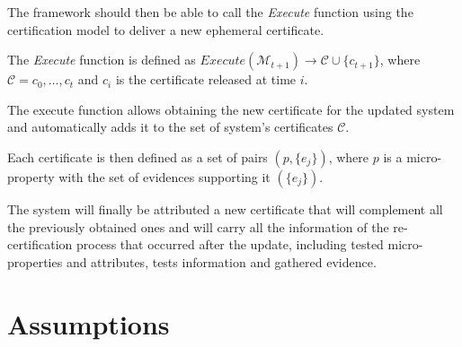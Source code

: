 The framework should then be able to call the \textit{Execute} function using the certification model to deliver a new ephemeral certificate.


\begin{defn}
The \textit{Execute} function is defined as \( Execute(\mathcal{M}_{t+1}) \rightarrow \mathcal{C} \cup \{c_{t+1}\} \), where \( \mathcal{C} = {c_0, \dots , c_t} \) and \(c_i\) is the certificate released at time \(i\).
\end{defn}
 The execute function allows obtaining the new certificate for the updated system and automatically adds it to the set of system's certificates \(\mathcal{C}\).
 
 \begin{defn}
 Each certificate is then defined as a set of pairs \( (p, \{e_j\}) \), where \(p\) is a micro-property with the set of evidences supporting it \( (\{e_j\}) \).
 \end{defn}
 
 The system will finally be attributed a new certificate that will complement all the previously obtained ones and will carry all the information of the re-certification process that occurred after the update, including tested micro-properties and attributes, tests information and gathered evidence.



\section{Assumptions}

